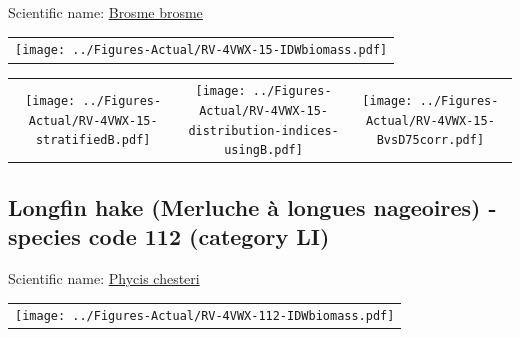 \documentclass[12pt]{article}\usepackage[]{graphicx}\usepackage[]{color}
\begin{document}

Scientific name: \href{http://www.marinespecies.org/aphia.php?p=taxdetails\&id=126447}{Brosme brosme} \newline
\begin{minipage}{1.0\textwidth}
 \begin{tabular}{c}
\texttt{[image: ../Figures-Actual/RV-4VWX-15-IDWbiomass.pdf]} \\ 
\end{tabular} 
\end{minipage}
\newline

\vspace{1cm}
\begin{minipage}{1.0\textwidth}
 \begin{tabular}{ccc}
\texttt{[image: ../Figures-Actual/RV-4VWX-15-stratifiedB.pdf]} & 
\texttt{[image: ../Figures-Actual/RV-4VWX-15-distribution-indices-usingB.pdf]} & 
\texttt{[image: ../Figures-Actual/RV-4VWX-15-BvsD75corr.pdf]} \\ 
\end{tabular} 
\end{minipage}
\clearpage

\renewcommand\thefigure{\thesubsection\Alph{figure}}

\setcounter{figure}{0}

\hypertarget{sec:112}{%
\subsection{Longfin hake (Merluche à longues nageoires) - species code 112 (category LI)}\label{sec:112}}

  


Scientific name: \href{http://www.marinespecies.org/aphia.php?p=taxdetails\&id=158988}{Phycis chesteri} \newline
\begin{minipage}{1.0\textwidth}
 \begin{tabular}{c}
\texttt{[image: ../Figures-Actual/RV-4VWX-112-IDWbiomass.pdf]} \\ 
\end{tabular} 
\end{minipage}
\newline
\end{document}
